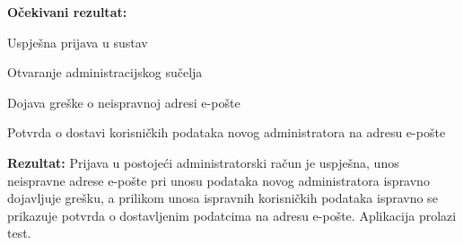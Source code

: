 			 
			 \textbf{Očekivani rezultat:}
			 \begin{packed_enum}
			 	\item {Uspješna prijava u sustav}
			 	\item {Otvaranje administracijskog sučelja}
			 	\item {Dojava greške o neispravnoj adresi e-pošte}
			 	\item {Potvrda o dostavi korisničkih podataka novog administratora na adresu e-pošte}
			 \end{packed_enum}
			 \textbf{Rezultat: }Prijava u postojeći administratorski račun je uspješna, unos neispravne adrese e-pošte pri unosu podataka novog administratora ispravno dojavljuje grešku, a prilikom unosa ispravnih korisničkih podataka ispravno se prikazuje potvrda o dostavljenim podatcima na adresu e-pošte. {\color{green} Aplikacija prolazi test.}\\
			 
